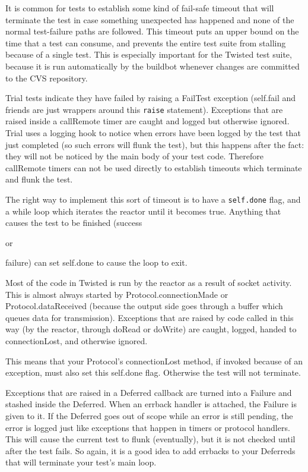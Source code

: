 It is common for tests to establish some kind of fail-safe timeout that will terminate the test in case something unexpected has happened and none of the normal test-failure paths are followed. This timeout puts an upper bound on the time that a test can consume, and prevents the entire test suite from stalling because of a single test. This is especially important for the Twisted test suite, because it is run automatically by the buildbot whenever changes are committed to the CVS repository.

Trial tests indicate they have failed by raising a FailTest exception (self.fail and friends are just wrappers around this \texttt{raise} statement). Exceptions that are raised inside a callRemote timer are caught and logged but otherwise ignored. Trial uses a logging hook to notice when errors have been logged by the test that just completed (so such errors will flunk the test), but this happens after the fact: they will not be noticed by the main body of your test code. Therefore callRemote timers can not be used directly to establish timeouts which terminate and flunk the test.

The right way to implement this sort of timeout is to have a \texttt{self.\linebreak[1]done} flag, and a while loop which iterates the reactor until it becomes true. Anything that causes the test to be finished (success \begin{em}or\end{em} failure) can set self.done to cause the loop to exit.

Most of the code in Twisted is run by the reactor as a result of socket activity. This is almost always started by Protocol.connectionMade or Protocol.dataReceived (because the output side goes through a buffer which queues data for transmission). Exceptions that are raised by code called in this way (by the reactor, through doRead or doWrite) are caught, logged, handed to connectionLost, and otherwise ignored.

This means that your Protocol's connectionLost method, if invoked because of an exception, must also set this self.done flag. Otherwise the test will not terminate.

Exceptions that are raised in a Deferred callback are turned into a Failure and stashed inside the Deferred. When an errback handler is attached, the Failure is given to it. If the Deferred goes out of scope while an error is still pending, the error is logged just like exceptions that happen in timers or protocol handlers. This will cause the current test to flunk (eventually), but it is not checked until after the test fails. So again, it is a good idea to add errbacks to your Deferreds that will terminate your test's main loop.

